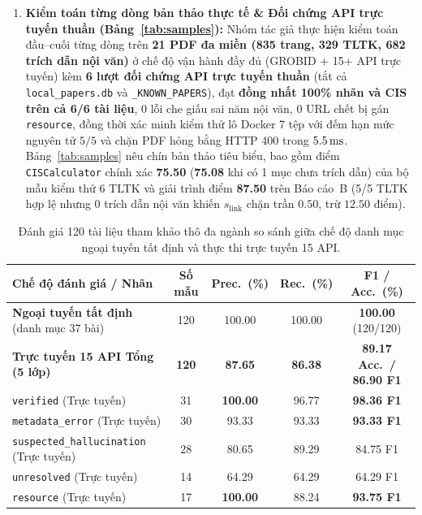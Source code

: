 \begin{enumerate}
    \item \textbf{Kiểm toán từng dòng bản thảo thực tế \& Đối chứng API trực tuyến thuần (Bảng~\ref{tab:samples}):} Nhóm tác giả thực hiện kiểm toán đầu--cuối từng dòng trên \textbf{21 PDF đa miền (835 trang, 329 TLTK, 682 trích dẫn nội văn)} ở chế độ vận hành đầy đủ (GROBID + 15+ API trực tuyến) kèm \textbf{6 lượt đối chứng API trực tuyến thuần} (tắt cả \texttt{local\_papers.db} và \texttt{\_KNOWN\_PAPERS}), đạt \textbf{đồng nhất 100\% nhãn và CIS trên cả 6/6 tài liệu}, $0$ lỗi che giấu sai năm nội văn, $0$ URL chết bị gán \texttt{resource}, đồng thời xác minh kiểm thử lô Docker 7 tệp với đếm hạn mức nguyên tử $5/5$ và chặn PDF hỏng bằng HTTP 400 trong $5.5\text{\,ms}$. Bảng~\ref{tab:samples} nêu chín bản thảo tiêu biểu, bao gồm điểm \texttt{CISCalculator} chính xác \textbf{75.50} (\textbf{75.08} khi có 1 mục chưa trích dẫn) của bộ mẫu kiểm thử 6 TLTK và giải trình điểm \textbf{87.50} trên Báo cáo~B (5/5 TLTK hợp lệ nhưng 0 trích dẫn nội văn khiến $s_{\text{link}}$ chặn trần $0.50$, trừ $12.50$ điểm).
\end{enumerate}

{\setlength{\tabcolsep}{3.5pt}
\begin{table}[!htbp]
\centering
\caption{Đánh giá 120 tài liệu tham khảo thô đa ngành so sánh giữa chế độ danh mục ngoại tuyến tất định và thực thi trực tuyến 15 API.}\label{tab:e2e-gold}
\begin{tabular}{|L{0.34}|C{0.15}|C{0.15}|C{0.18}|C{0.18}|}
\hline
\textbf{Chế độ đánh giá / Nhãn} & \textbf{Số mẫu} & \textbf{Prec.\ (\%)} & \textbf{Rec.\ (\%)} & \textbf{F1 / Acc.\ (\%)} \\
\hline
\textbf{Ngoại tuyến tất định} (danh mục 37 bài) & 120 & 100.00 & 100.00 & \textbf{100.00} (120/120) \\
\hline
\textbf{Trực tuyến 15 API Tổng (5 lớp)} & \textbf{120} & \textbf{87.65} & \textbf{86.38} & \textbf{89.17 Acc.\ / 86.90 F1} \\
\hline
\quad \texttt{verified} (Trực tuyến) & 31 & \textbf{100.00} & 96.77 & \textbf{98.36 F1} \\
\hline
\quad \texttt{metadata\_error} (Trực tuyến) & 30 & 93.33 & 93.33 & \textbf{93.33 F1} \\
\hline
\quad \texttt{suspected\_hallucination} (Trực tuyến) & 28 & 80.65 & 89.29 & 84.75 F1 \\
\hline
\quad \texttt{unresolved} (Trực tuyến) & 14 & 64.29 & 64.29 & 64.29 F1 \\
\hline
\quad \texttt{resource} (Trực tuyến) & 17 & \textbf{100.00} & 88.24 & \textbf{93.75 F1} \\
\hline
\end{tabular}
\end{table}
}


